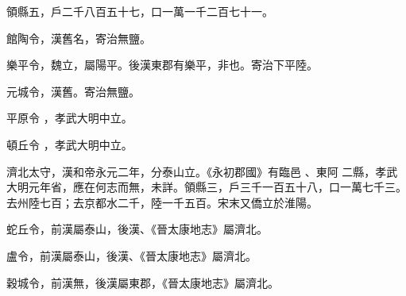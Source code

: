\begin{pinyinscope}
 領縣五，戶二千八百五十七，口一萬一千二百七十一。



 館陶令，漢舊名，寄治無鹽。



 樂平令，魏立，屬陽平。後漢東郡有樂平，非也。寄治下平陸。



 元城令，漢舊。寄治無鹽。


平原令
 ，孝武大明中立。


頓丘令
 ，孝武大明中立。


濟北太守，漢和帝永元二年，分泰山立。《永初郡國》有臨邑
 、東阿
 二縣，孝武大明元年省，應在何志而無，未詳。領縣三，戶三千一百五十八，口一萬七千三。去州陸七百；去京都水二千，陸一千五百。宋末又僑立於淮陽。



 蛇丘令，前漢屬泰山，後漢、《晉太康地志》屬濟北。



 盧令，前漢屬泰山，後漢、《晉太康地志》屬濟北。



 穀城令，前漢無，後漢屬東郡，《晉太康地志》屬濟北。



\end{pinyinscope}